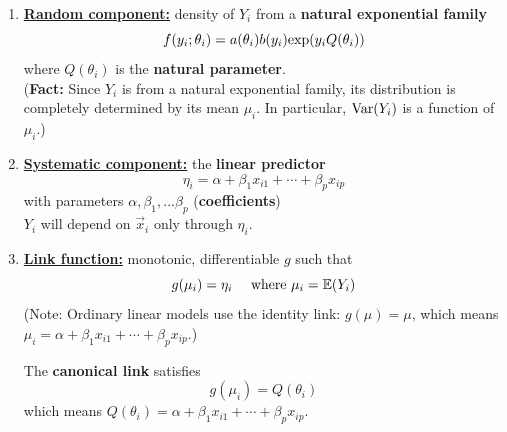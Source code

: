 \documentclass[11pt]{elegantbook}
\begin{document}
\begin{enumerate}[(1)]
    \item \textbf{\underline{Random component:}} density of $Y_i$ from a \textbf{natural exponential family} $$f(y_i;\theta_i)=a(\theta_i)b(y_i)\textnormal{exp}(y_i Q(\theta_i))$$
    where $Q(\theta_i)$ is the \textbf{natural parameter}.\\
    (\textbf{Fact:} Since $Y_i$ is from a natural exponential family, its distribution is completely determined by its mean $\mu_i$. In particular, $\textnormal{Var}(Y_i)$ is a function of $\mu_i$.)
    \item \textbf{\underline{Systematic component:}} the \textbf{linear predictor}
    $$\eta_i = \alpha+\beta_1 x_{i1}+\cdots +\beta_p x_{ip}$$
    with parameters $\alpha,\beta_1,...\beta_p$ (\textbf{coefficients})\\
    $Y_i$ will depend on $\vec{x}_i$ only through $\eta_i$.
    \item \textbf{\underline{Link function:}} monotonic, differentiable $g$ such that
    $$g(\mu_i)=\eta_i\quad \textnormal{ where }\mu_i=\mathbb{E}(Y_i)$$
    (Note: Ordinary linear models use the identity link: $g(\mu)=\mu$, which means $\mu_i=\alpha+\beta_1 x_{i1}+\cdots +\beta_p x_{ip}$.)
    \begin{definition}
        The \textbf{canonical link} satisfies $$g(\mu_i)=Q(\theta_i)$$
        which means $Q(\theta_i)=\alpha+\beta_1 x_{i1}+\cdots +\beta_p x_{ip}$.
    \end{definition}
\end{enumerate}
\end{document}
